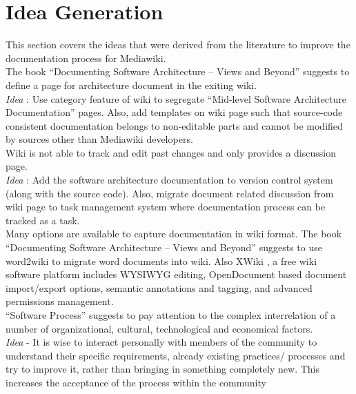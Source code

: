 \section{Idea Generation}
\indent This section covers the ideas that were derived from the literature to improve the documentation process for Mediawiki.
\\\indent The book \enquote{Documenting Software Architecture – Views and Beyond} \cite{BachmannDocumentingSoftware2010} suggests to define a page for architecture document in the exiting wiki.
\\\indent \emph{Idea} : Use category feature of wiki to segregate \enquote{Mid-level Software Architecture Documentation} pages. Also, add templates on wiki page such that source-code consistent documentation belongs to non-editable parts and cannot be modified by sources other than Mediawiki developers.
\newline
\\\indent Wiki is not able to track and edit past changes and only provides a discussion page.
\\\indent \emph{Idea} : Add the software architecture documentation to version control system (along with the source code). Also, migrate document related discussion from wiki page to task management system where documentation process can be tracked as a task.
\\\indent Many options are available to capture documentation in wiki format. The book \enquote{Documenting Software Architecture – Views and Beyond} \cite{BachmannDocumentingSoftware2010} suggests to use word2wiki to migrate word documents into wiki. Also XWiki \cite{Xwiki_Massol_2014}, a free wiki software platform includes WYSIWYG editing, OpenDocument based document import/export options, semantic annotations and tagging, and advanced permissions management.
\newline
\\\indent \enquote{Software Process} \cite{Fuggeffa1988} suggests to pay attention to the complex interrelation of a number of organizational, cultural, technological and economical factors.
\\\indent\emph{Idea}	- It is wise to interact personally with members of the community to understand their specific requirements, already existing practices/ processes and try to improve it, rather than bringing in something completely new. This increases the acceptance of the process within the community
\newline
